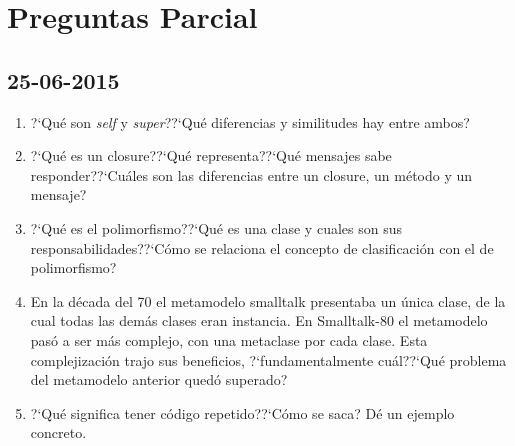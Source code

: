 \section{Preguntas Parcial}

\subsection{25-06-2015}

\begin{enumerate}
 \item ?`Qu\'e son {\it self} y {\it super}??`Qu\'e diferencias y similitudes hay entre ambos? 
 \item ?`Qu\'e es un closure??`Qu\'e representa??`Qu\'e mensajes sabe responder??`Cu\'ales son las diferencias entre un closure, un m\'etodo y un mensaje?
 \item ?`Qu\'e es el polimorfismo??`Qu\'e es una clase y cuales son sus responsabilidades??`C\'omo se relaciona el concepto de clasificaci\'on con el de polimorfismo? 
 \item En la d\'ecada del 70 el metamodelo smalltalk presentaba un \'unica clase, de la cual todas las dem\'as clases eran instancia. En Smalltalk-80 el metamodelo pas\'o a ser m\'as complejo, con una metaclase por cada clase. Esta complejizaci\'on trajo sus beneficios, ?`fundamentalmente cu\'al??`Qu\'e problema del metamodelo anterior qued\'o superado?
 \item ?`Qu\'e significa tener c\'odigo repetido??`C\'omo se saca? D\'e un ejemplo concreto. 
\end{enumerate}


